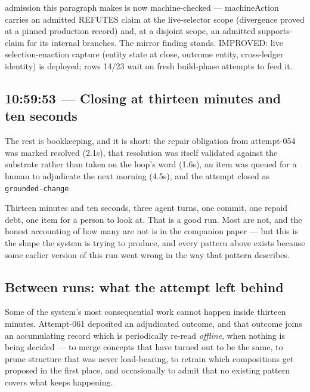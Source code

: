 {admission this paragraph makes is now machine-checked --- machineAction
carries an admitted REFUTES claim at the live-selector scope (divergence
proved at a pinned production record) and, at a disjoint scope, an
admitted supports-claim for its internal branches. The mirror finding
stands. IMPROVED: live selection-enaction capture (entity state at close,
outcome entity, cross-ledger identity) is deployed; rows 14/23 wait on
fresh build-phase attempts to feed it.}

\subsection*{10:59:53 --- Closing at thirteen minutes and ten seconds}

The rest is bookkeeping, and it is short: the repair obligation from
attempt-054 was marked resolved (2.1s), that resolution was itself validated
against the substrate rather than taken on the loop's word (1.6s), an item was
queued for a human to adjudicate the next morning (4.5s), and the attempt closed
as \texttt{grounded-change}.

Thirteen minutes and ten seconds, three agent turns, one commit, one repaid debt, one item for a
person to look at.  That is a good run.  Most are not, and the honest accounting
of how many are not is in the companion paper --- but this is the shape the
system is trying to produce, and every pattern above exists because some earlier
version of this run went wrong in the way that pattern describes.

\subsection*{Between runs: what the attempt left behind}

Some of the system's most consequential work cannot happen inside thirteen
minutes.  Attempt-061 deposited an adjudicated outcome, and that outcome joins
an accumulating record which is periodically re-read \emph{offline}, when
nothing is being decided --- to merge concepts that have turned out to be the
same, to prune structure that was never load-bearing, to retrain which
compositions get proposed in the first place, and occasionally to admit that no
existing pattern covers what keeps happening.

